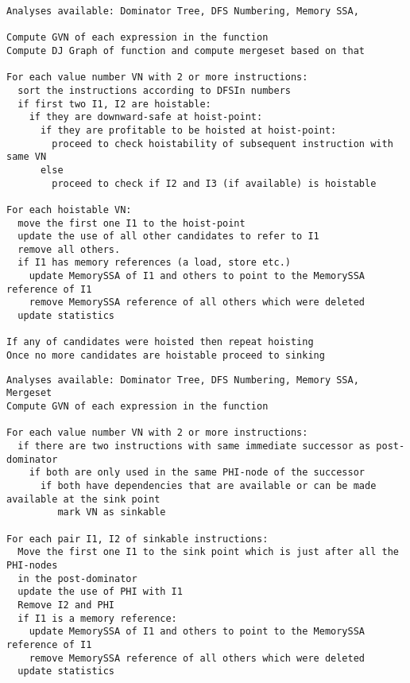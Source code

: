 \documentclass[acmlarge,review]{acmart}\settopmatter{printfolios=true}
\begin{document}
\begin{verbatim}
Analyses available: Dominator Tree, DFS Numbering, Memory SSA,

Compute GVN of each expression in the function
Compute DJ Graph of function and compute mergeset based on that

For each value number VN with 2 or more instructions:
  sort the instructions according to DFSIn numbers
  if first two I1, I2 are hoistable:
    if they are downward-safe at hoist-point:
      if they are profitable to be hoisted at hoist-point:
        proceed to check hoistability of subsequent instruction with same VN
      else
        proceed to check if I2 and I3 (if available) is hoistable

For each hoistable VN:
  move the first one I1 to the hoist-point
  update the use of all other candidates to refer to I1
  remove all others.
  if I1 has memory references (a load, store etc.)
    update MemorySSA of I1 and others to point to the MemorySSA reference of I1
    remove MemorySSA reference of all others which were deleted
  update statistics

If any of candidates were hoisted then repeat hoisting
Once no more candidates are hoistable proceed to sinking
\end{verbatim}


\begin{verbatim}
Analyses available: Dominator Tree, DFS Numbering, Memory SSA, Mergeset
Compute GVN of each expression in the function

For each value number VN with 2 or more instructions:
  if there are two instructions with same immediate successor as post-dominator
    if both are only used in the same PHI-node of the successor
      if both have dependencies that are available or can be made available at the sink point
         mark VN as sinkable

For each pair I1, I2 of sinkable instructions:
  Move the first one I1 to the sink point which is just after all the PHI-nodes
  in the post-dominator
  update the use of PHI with I1
  Remove I2 and PHI
  if I1 is a memory reference:
    update MemorySSA of I1 and others to point to the MemorySSA reference of I1
    remove MemorySSA reference of all others which were deleted
  update statistics

\end{verbatim}
\end{document}
